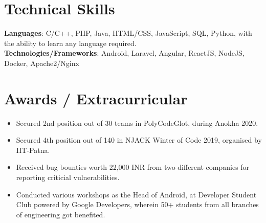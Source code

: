 \documentclass[letterpaper,11pt]{article}
\newcommand{\resumeItem}[1]{
  \item\small{
    {#1 \vspace{-2pt}}
  }
}
\newcommand{\resumeItemListStart}{\begin{itemize}}
\newcommand{\resumeItemListEnd}{\end{itemize}\vspace{-5pt}}
\begin{document}
%
\section{Technical Skills}
 \begin{itemize}[leftmargin=0.15in, label={}]
    \small{\item{
     \textbf{Languages}{: C/C++, PHP, Java, HTML/CSS, JavaScript, SQL, Python, with the ability to learn any language required.} \\
     \textbf{Technologies/Frameworks}{: Android, Laravel, Angular, ReactJS, NodeJS, Docker, Apache2/Nginx} \\
    }}
 \end{itemize}
 \vspace{-16pt}


\section{Awards / Extracurricular}
            \resumeItemListStart
                \resumeItem{Secured 2nd position out of 30 teams in PolyCodeGlot, during Anokha 2020.}\vspace{-5pt}
                \resumeItem{Secured 4th position out of 140 in NJACK Winter of Code 2019, organised by IIT-Patna.}\vspace{-5pt}
                \resumeItem{Received bug bounties worth 22,000 INR from two different companies for reporting criticial vulnerabilities.}\vspace{-5pt}
                \resumeItem{Conducted various workshops as the Head of Android, at Developer Student Club powered by Google Developers,  wherein 50+ students from all branches of engineering got benefited.}\vspace{-5pt}
            \resumeItemListEnd
\end{document}
